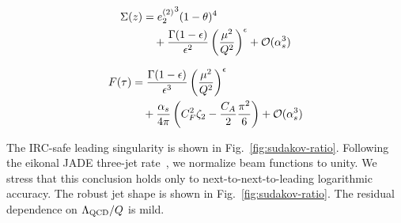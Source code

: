 \begin{align}
  \Sigma(z) &= {e_2^{(2)}}^{3} (1 - \theta)^{4} \nonumber \\
  &\quad + \frac{\Gamma(1-\epsilon)}{\epsilon^{2}} \left(\frac{\mu^2}{Q^2}\right)^{\epsilon} + \mathcal{O}(\alpha_s^3) \label{eq:6}
\end{align}

\begin{align}
  F(\tau) &= \frac{\Gamma(1-\epsilon)}{\epsilon^{3}} \left(\frac{\mu^2}{Q^2}\right)^{\epsilon} \nonumber \\
  &\quad + \frac{\alpha_s}{4\pi} \left( C_F^2 \zeta_{2} - \frac{C_A}{2} \frac{\pi^2}{6} \right) + \mathcal{O}(\alpha_s^3) \label{eq:7}
\end{align}

The IRC-safe leading singularity is shown in
Fig.~\ref{fig:sudakov-ratio}. Following the eikonal JADE three-jet
rate~\cite{TPC:1024-Towards-Hierarchical-Track-Reconstruction-at-the-Electron-Ion-Collider-September-24-2026},
we normalize beam functions to unity. We stress that this conclusion
holds only to next-to-next-to-leading logarithmic accuracy. The robust
jet shape is shown in Fig.~\ref{fig:sudakov-ratio}. The residual
dependence on $\Lambda_{\rm QCD}/Q$ is mild.


